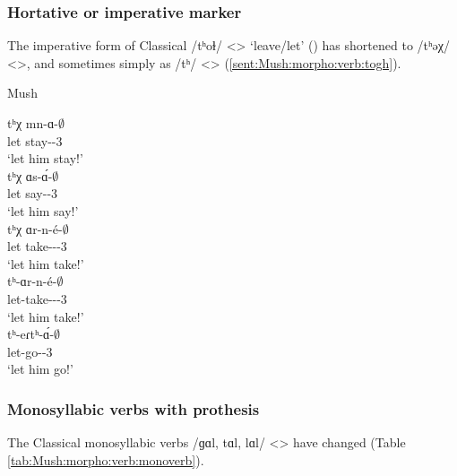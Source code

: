 \begin{adjarianpage}\label{page:120}\end{adjarianpage}%

\subsubsection{Hortative or imperative marker}

The imperative form of Classical /tʰoɫ/ <> `leave/let' () has shortened to /tʰəχ/ <>, and sometimes simply as /tʰ/ <> (\ref{sent:Mush:morpho:verb:togh}). 

\begin{exe}
	\ex Mush \label{sent:Mush:morpho:verb:togh}
	\begin{xlist}
		\ex \gll tʰχ mn-ɑ-$\emptyset$ \\
		let stay-{\thgloss}-3{\sg} \\
		\trans `let him stay!' \\
		\ex \gll tʰχ ɑs-\'ɑ-$\emptyset$ \\
		let say-{\thgloss}-3{\sg} \\
		\trans `let him say!' \\
		\ex \gll tʰχ ɑr-n-\'e-$\emptyset$ \\
		let take-{\vx}-{\thgloss}-3{\sg} \\
		\trans `let him take!' \\
		\ex \gll tʰ-ɑr-n-\'e-$\emptyset$ \\
		let-take-{\vx}-{\thgloss}-3{\sg} \\
		\trans `let him take!' \\
		\ex \gll tʰ-eɾtʰ-\'ɑ-$\emptyset$ \\
		let-go-{\thgloss}-3{\sg} \\
		\trans `let him go!' \\
	\end{xlist}
\end{exe}

\subsubsection{Monosyllabic verbs with  prothesis}

The Classical monosyllabic verbs /ɡɑl, tɑl, lɑl/ <> have changed (Table \ref{tab:Mush:morpho:verb:monoverb}). 

